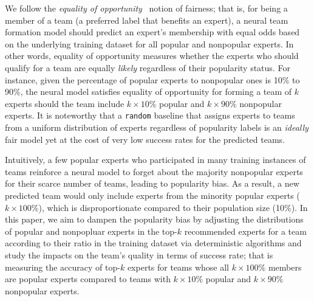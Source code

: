 \documentclass[runningheads]{llncs}
\begin{document}
We follow the \textit{equality of opportunity}~\cite{hardt2016equality} notion of fairness; that is, for being a member of a team (a preferred label that benefits an expert), a neural team formation model should predict an expert's membership with equal odds based on the underlying training dataset for all popular and nonpopular experts. In other words, equality of opportunity measures whether the experts who should qualify for a team are equally \textit{likely} regardless of their popularity status. For instance, given the percentage of popular experts to nonpopular ones is 10\% to 90\%, the neural model satisfies equality of opportunity for forming a team of $k$ experts should the team include $k\times 10\%$ popular and $k\times 90\%$ nonpopular experts. It is noteworthy that a \texttt{random} baseline that assigns experts to teams from a uniform distribution of experts regardless of popularity labels is an \textit{ideally} fair model yet at the cost of very low success rates for the predicted teams.

Intuitively, a few popular experts who participated in  many training instances of teams reinforce a neural model to forget about the majority nonpopular experts for their scarce number of teams, leading to popularity bias. As a result, a new predicted team would only include experts from the minority popular experts ($k\times 100\%$), which is disproportionate compared to their population size (10\%). In this paper, we aim to dampen the popularity bias by adjusting the distributions of popular and nonpopluar experts in the top-$k$ recommended experts for a team according to their ratio in the training dataset via deterministic algorithms and study the impacts on the team's quality in terms of success rate; that is measuring the accuracy of top-$k$ experts for teams whose all $k\times 100\%$ members are popular experts compared to teams with $k\times 10\%$ popular and $k\times 90\%$ nonpopular experts. 

\end{document}
